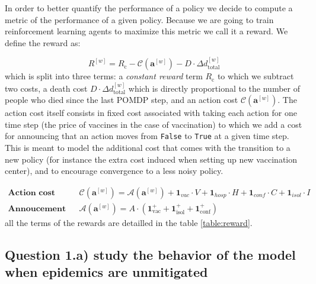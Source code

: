 \documentclass[10pt]{article}
\begin{document}
In order to better quantify the performance of a policy we decide to compute a metric of the performance of a given policy.
Because we are going to train reinforcement learning agents to maximize this metric we call it a reward. We define the reward as:

\begin{equation}
    R^{[w]} =  R_\text{c}
    - \mathcal{C}(\mathbf{a}^{[w]})
    - D \cdot \Delta d_\text{total}^{[w]}
\end{equation}
which is split into three terms: a \textit{constant reward} term $R_\text{c}$ to which we subtract two costs, a death cost $D \cdot \Delta d_\text{total}^{[w]}$ which is directly proportional to the number of people who died since the last POMDP step, and an action cost $\mathcal{C}(\mathbf{a}^{[w]})$. The action cost itself consists in fixed cost associated with taking each action for one time step  (the price of vaccines in the case of vaccination) to which we add a cost for announcing that an action moves from \texttt{False} to \texttt{True} at a given time step. This is meant to model the additional cost that comes with the transition to a new policy (for instance the extra cost induced when setting up new vaccination center), and to encourage convergence to a less noisy policy.

\begin{equation}
  \begin{aligned}
    \textbf{Action cost} &&
    \mathcal{C}(\mathbf{a}^{[w]}) =  
    \mathcal{A}(\mathbf{a}^{[w]}) 
    + \mathbf{1}_{vac}  \cdot V
    + \mathbf{1}_{hosp} \cdot H
    + \mathbf{1}_{conf} \cdot C
    + \mathbf{1}_{isol} \cdot I \\
    \textbf{Annoucement costs} &&
    \mathcal{A}(\mathbf{a}^{[w]})  = A \cdot (\mathbf{1}^+_\text{vac} + \mathbf{1}^+_\text{isol} + \mathbf{1}^+_\text{conf})
  \end{aligned}
\end{equation}
\noindent
all the terms of the rewards are detailled in the table \ref{table:reward}. 




\subsection*{Question 1.a) study the behavior of the model when epidemics are unmitigated}
\end{document}
